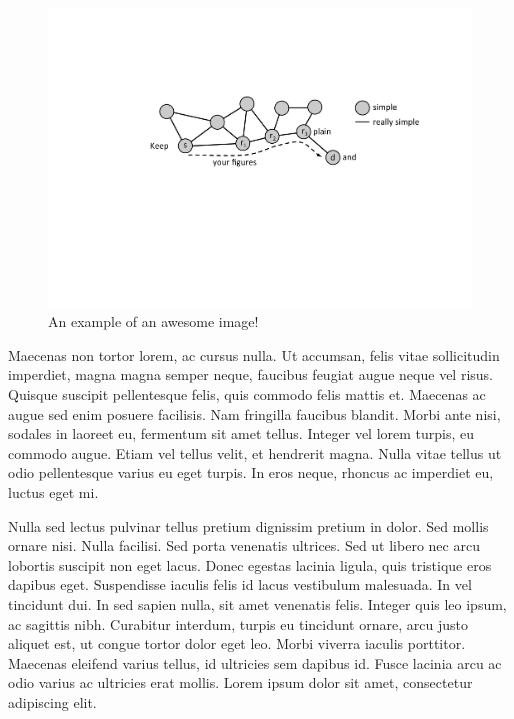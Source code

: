 \begin{figure}[t]
\centering
\includegraphics[width=1\columnwidth]{figures/example}
\caption{An example of an awesome image!}
\label{fig:example}
\end{figure}


Maecenas non tortor lorem, ac cursus nulla. Ut accumsan, felis vitae sollicitudin imperdiet, magna magna semper neque, faucibus feugiat augue neque vel risus. Quisque suscipit pellentesque felis, quis commodo felis mattis et. Maecenas ac augue sed enim posuere facilisis. Nam fringilla faucibus blandit. Morbi ante nisi, sodales in laoreet eu, fermentum sit amet tellus. Integer vel lorem turpis, eu commodo augue. Etiam vel tellus velit, et hendrerit magna. Nulla vitae tellus ut odio pellentesque varius eu eget turpis. In eros neque, rhoncus ac imperdiet eu, luctus eget mi.

Nulla sed lectus pulvinar tellus pretium dignissim pretium in dolor. Sed mollis ornare nisi. Nulla facilisi. Sed porta venenatis ultrices. Sed ut libero nec arcu lobortis suscipit non eget lacus. Donec egestas lacinia ligula, quis tristique eros dapibus eget. Suspendisse iaculis felis id lacus vestibulum malesuada. In vel tincidunt dui. In sed sapien nulla, sit amet venenatis felis. Integer quis leo ipsum, ac sagittis nibh. Curabitur interdum, turpis eu tincidunt ornare, arcu justo aliquet est, ut congue tortor dolor eget leo. Morbi viverra iaculis porttitor. Maecenas eleifend varius tellus, id ultricies sem dapibus id. Fusce lacinia arcu ac odio varius ac ultricies erat mollis. Lorem ipsum dolor sit amet, consectetur adipiscing elit.

